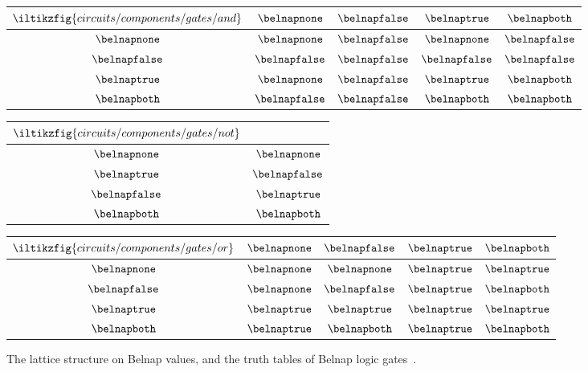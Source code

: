 \begin{figure*}
    \centering
    \quad
    \begin{tabular}{|c|cccc|}
        \hline
        \(\iltikzfig{circuits/components/gates/and}\) & \(\belnapnone\) & \(\belnapfalse\) & \(\belnaptrue\) & \(\belnapboth\) \\
        \hline
        \(\belnapnone\)  & \(\belnapnone\) & \(\belnapfalse\) & \(\belnapnone\) & \(\belnapfalse\) \\
        \(\belnapfalse\) & \(\belnapfalse\) & \(\belnapfalse\) & \(\belnapfalse\) & \(\belnapfalse\) \\
        \(\belnaptrue\) & \(\belnapnone\) & \(\belnapfalse\) & \(\belnaptrue\) & \(\belnapboth\) \\
        \(\belnapboth\) & \(\belnapfalse\) & \(\belnapfalse\) & \(\belnapboth\) & \(\belnapboth\) \\
        \hline
    \end{tabular}
    \quad
    \begin{tabular}{|c|c|}
        \hline
        \(\iltikzfig{circuits/components/gates/not}\) & \\
        \hline
        \(\belnapnone\) & \(\belnapnone\) \\
        \(\belnaptrue\) & \(\belnapfalse\) \\
        \(\belnapfalse\) & \(\belnaptrue\) \\
        \(\belnapboth\) & \(\belnapboth\) \\
        \hline
    \end{tabular}
    \quad
    \begin{tabular}{|c|cccc|}
        \hline
        \(\iltikzfig{circuits/components/gates/or}\) & \(\belnapnone\) & \(\belnapfalse\) & \(\belnaptrue\) & \(\belnapboth\) \\
        \hline
        \(\belnapnone\)  & \(\belnapnone\) & \(\belnapnone\) & \(\belnaptrue\) & \(\belnaptrue\) \\
        \(\belnapfalse\) & \(\belnapnone\) & \(\belnapfalse\) & \(\belnaptrue\) & \(\belnapboth\) \\
        \(\belnaptrue\) & \(\belnaptrue\) & \(\belnaptrue\) & \(\belnaptrue\) & \(\belnaptrue\) \\
        \(\belnapboth\) & \(\belnaptrue\) & \(\belnapboth\) & \(\belnaptrue\) & \(\belnapboth\) \\
        \hline
    \end{tabular}

    \caption{The lattice structure on Belnap values, and the truth tables
    of Belnap logic gates~\cite{belnap1977useful}.}
    \label{tab:truths}
\end{figure*}